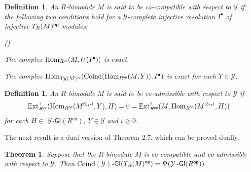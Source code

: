 \documentclass[10pt,twoside]{amsart}
\theoremstyle{bfupright head,slanted body}
\theoremstyle{bfupright head,upright body}
\theoremstyle{fixed bf head,slanted body}
\newtheorem{thm}[res]{Theorem}          \newtheorem*{thm*}{Theorem}
\newtheorem{lem}[res]{Lemma}            \newtheorem*{lem*}{Lemma}
\theoremstyle{fixed bf head,upright body}
\newtheorem{dfn}[res]{Definition}       \newtheorem*{dfn*}{Definition}
\theoremstyle{numbered paragraph}
\newlength{\thmlistleft}        %
\newlength{\thmlistright}       %
\newlength{\thmlistpartopsep}   %
\newlength{\thmlisttopsep}      %
\newlength{\thmlistparsep}      %
\newlength{\thmlistitemsep}     %
\newcounter{prt}
\newenvironment{prt}{\begin{list}{\upshape (\alph{prt})}%
    {\usecounter{prt}%
      \setlength{\leftmargin}{\thmlistleft}%
      \setlength{\labelwidth}{\thmlistleft}%
      \setlength{\rightmargin}{\thmlistright}%
      \setlength{\partopsep}{\thmlistpartopsep}%
      \setlength{\topsep}{\thmlisttopsep}%
      \setlength{\parsep}{\thmlistparsep}%
      \setlength{\itemsep}{\thmlistitemsep}}}%
  {\end{list}}%
\newenvironment{prf*}[1][Proof]{%
  \begin{proof}[\bf #1]
    \setcounter{equation}{0}
    \renewcommand{\theequation}{\arabic{equation}}}
  {\end{proof}
  }
\numberwithin{equation}{res}
\newcommand{\GI}{\mathsf{GI}}
\newcommand{\FI}{\mathsf{FI}}
\newcommand{\Coind}{\mathrm{Coind}}
\newcommand{\Rop}{R^{\sf op}}
\newcommand{\op}{\sf op}
\newcommand{\Hom}{\operatorname{Hom}}
\newcommand{\Ext}{\operatorname{Ext}}
\begin{document}
\begin{dfn} \label{dfn of cocompatible}
An $R$-bimodule $M$ is said to be \emph{co}-\emph{compatible with respect to $\mathcal{Y}$} if
the following two conditions hold
for a $\mathcal{Y}$-complete injective resolution $I^\bullet$ of injective $T_R(M)^{\op}$-modules:
\begin{prt}
\item[(C1')] The complex $\Hom_{\Rop}(M, U(I^\bullet))$ is exact.
\item[(C2')] The complex $\Hom_{T_R(M)^{\op}}(\Coind(\Hom_{\Rop}(M, Y)), I^\bullet)$ is exact for each $Y\in\mathcal{Y}$.
\end{prt}
\end{dfn}

\begin{dfn} \label{dfn of coadmissible}
An $R$-bimodule $M$ is said to be \emph{co}-\emph{admissible with respect to $\mathcal{Y}$} if
\[
\Ext_{\Rop}^1(\Hom_{\Rop}(M^{\otimes_Ri}, Y), H)=0=\Ext_{\Rop}^1(M, \Hom_{\Rop}(M^{\otimes_Ri},H))
\]
for each $H \in$ $\mathcal{Y}$-$\GI(R^{op})$, $Y \in \mathcal{Y}$ and $i\geqslant 0$.
\end{dfn}




The next result is a dual version of Theorem 2.7, which can be proved dually.

\begin{thm} \label{THM GITRM = Psi cons}
Suppose that the $R$-bimodule $M$ is co-compatible and co-admissible with respect to $\mathcal{Y}$.
Then $\Coind(\mathcal{Y})$-$\GI(T_R(M)^{\op}) = \Psi(\mathcal{Y}$-$\GI(\Rop))$.
\end{thm}
\end{document}
